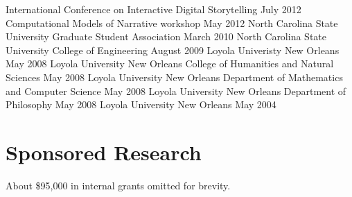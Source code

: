 \documentclass{cv}
\begin{document}
	{International Conference on Interactive Digital Storytelling}
	{July 2012}
	{Computational Models of Narrative workshop}
	{May 2012}
	{North Carolina State University Graduate Student Association}
	{March 2010}
	{North Carolina State University College of Engineering}
	{August 2009}
	{Loyola Univeristy New Orleans}
	{May 2008}
	{Loyola University New Orleans College of Humanities and Natural Sciences}
	{May 2008}
	{Loyola University New Orleans Department of Mathematics and Computer Science}
	{May 2008}
	{Loyola University New Orleans Department of Philosophy}
	{May 2008}
	{Loyola University New Orleans}
	{May 2004}
	

\section*{Sponsored Research}

About \$95,000 in internal grants omitted for brevity.\\
\end{document}
